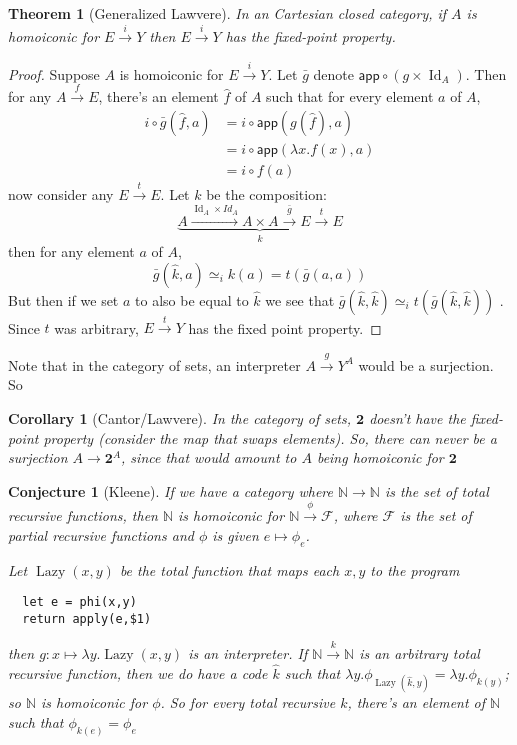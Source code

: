 \documentclass{article}
\newtheorem{theorem}{Theorem}
\newtheorem{corrolary}{Corollary}
\newtheorem{conjecture}{Conjecture}
\DeclareMathOperator{\Id}{Id}
\DeclareMathOperator{\Lazy}{Lazy}
\begin{document}
\begin{theorem}[Generalized Lawvere] In an Cartesian closed category, if $A$ is homoiconic for $E\xrightarrow{i}Y$ then $E\xrightarrow{i}Y$ has the fixed-point property.
\end{theorem}
\begin{proof}
  Suppose $A$ is homoiconic for $E\xrightarrow{i}Y$. Let $\bar{g}$ denote $\mathsf{app} \circ
  (g\times \Id_A)$. Then for any $A\xrightarrow{f}E$, there's an element
  $\hat{f}$ of $A$ such that for every element $a$ of $A$, 
  \begin{align*}
    i\circ \bar{g}(\hat{f}, a) &= i\circ \mathsf{app}(g(\hat{f}),a)  \\
                        &= i\circ \mathsf{app}(\lambda x. f(x),a)\\
                        &= i\circ f(a)
  \end{align*}
  now consider any $E\xrightarrow{t}E$. Let $k$ be the composition:
  $$\underbrace{A\xrightarrow{\Id_A\times Id_A} A\times A\xrightarrow{\bar{g}}E\xrightarrow{t}E}_k$$
  then for any element $a$ of $A$,
  $$\bar{g}(\hat{k}, a) \simeq_i k(a) = t(\bar{g}(a,a))$$
  But then if we set $a$ to also be equal to $\hat{k}$ we see that $\bar{g}(\hat{k},\hat{k})\simeq_i t(\bar{g}(\hat{k},\hat{k}))$ . Since $t$ was arbitrary, $E\xrightarrow{t}Y$ has the fixed point property.
\end{proof}

Note that in the category of sets, an interpreter $A\xrightarrow{g}Y^A$ would be
a surjection. So

\begin{corrolary}[Cantor/Lawvere] In the category of sets, $\mathbf{2}$ doesn't have the
  fixed-point property (consider the map that swaps elements). So, there can
  never be a surjection $A\rightarrow \mathbf{2}^A$, since that would amount to
  $A$ being homoiconic for $\mathbf{2}$
\end{corrolary}

\begin{conjecture}[Kleene] If we have a category where
  $\mathbb{N}\rightarrow\mathbb{N}$ is the set of total recursive functions,
  then $\mathbb{N}$ is homoiconic for $\mathbb{N}\xrightarrow{\phi}\mathcal{F}$,
  where $\mathcal{F}$ is the set of partial recursive functions and $\phi$ is 
  given $e\mapsto\phi_e$.

  Let $\Lazy(x,y)$ be the total function that maps each $x,y$ to the program
  \begin{verbatim}
  let e = phi(x,y)
  return apply(e,$1)
  \end{verbatim}
  then $g:x\mapsto \lambda y.\Lazy(x,y)$ is an interpreter. If
  $\mathbb{N}\xrightarrow{k}\mathbb{N}$ is an
  arbitrary total recursive function, then we do have a code $\hat{k}$ such that
  $\lambda y.\phi_{\Lazy(\hat{k},y)} = \lambda y.\phi_{k(y)}$; so $\mathbb{N}$ is
  homoiconic for $\phi$. So for every total recursive $k$, there's an element of
  $\mathbb{N}$ such that $\phi_{k(e)} = \phi_e $
\end{conjecture}
\end{document}
